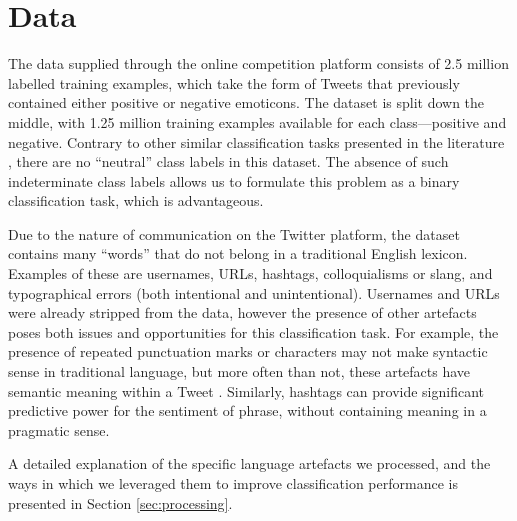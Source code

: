 \section{Data}
\label{sec:data}

The data supplied through the online competition platform consists of 2.5 million labelled training examples, which take the form of Tweets that previously contained either positive or negative emoticons. The dataset is split down the middle, with 1.25 million training examples available for each class---positive and negative. Contrary to other similar classification tasks presented in the literature \cite{jiang2011target, tang2014learning}, there are no ``neutral'' class labels in this dataset. The absence of such indeterminate class labels allows us to formulate this problem as a binary classification task, which is advantageous.

Due to the nature of communication on the Twitter platform, the dataset contains many ``words'' that do not belong in a traditional English lexicon. Examples of these are usernames, URLs, hashtags, colloquialisms or slang, and typographical errors (both intentional and unintentional). Usernames and URLs were already stripped from the data, however the presence of other artefacts poses both issues and opportunities for this classification task. For example, the presence of repeated punctuation marks or characters may not make syntactic sense in traditional language, but more often than not, these artefacts have semantic meaning within a Tweet \cite{tang2014learning}. Similarly, hashtags can provide significant predictive power for the sentiment of phrase, without containing meaning in a pragmatic sense.

A detailed explanation of the specific language artefacts we processed, and the ways in which we leveraged them to improve classification performance is presented in Section \ref{sec:processing}.
